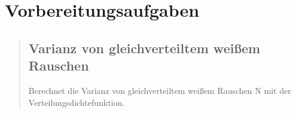 %     




\section{Vorbereitungsaufgaben}
\begin{quote}
    \hspace{-2em}
    \subsection{Varianz von gleichverteiltem weißem Rauschen}
    Berechnet die Varianz von gleichverteiltem weißem Rauschen N mit der Verteilungsdichtefunktion.\\
    \begin{quote}
    
    \end{quote}
      
\end{quote}



